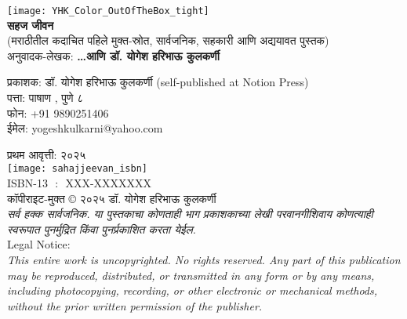 \thispagestyle{empty}

\begin{center}
\texttt{[image: YHK\_Color\_OutOfTheBox\_tight]} \\[1.5em]

\textbf{\Huge सहज जीवन}\\ [0.5em]
{\small(मराठीतील कदाचित पहिले मुक्त-स्रोत, सार्वजनिक, सहकारी आणि अद्ययावत  पुस्तक)}\\[0.5em]

अनुवादक-लेखक: \textbf{{\large \ldots आणि  डॉ. योगेश हरिभाऊ कुलकर्णी}}\\[1.5em]
\end{center}

\vspace{1.5em}

\begin{flushleft}

प्रकाशक: डॉ. योगेश हरिभाऊ कुलकर्णी (self-published at Notion Press)\\
पत्ता:  पाषाण ,  पुणे ८ \\
फोन:  +91 9890251406\\
ईमेल: yogeshkulkarni@yahoo.com\\[1.5em]

\vspace{0.5em}

प्रथम आवृत्ती: २०२५\\[0.5em]

\texttt{[image: sahajjeevan\_isbn]} \\ [0.5em]
ISBN-13 ‏ : ‎ XXX-XXXXXXX\\[1.5em]

कॉपीराइट-मुक्त © २०२५ डॉ. योगेश हरिभाऊ कुलकर्णी\\[0.5em]

{\textit{सर्व हक्क सार्वजनिक. या पुस्तकाचा कोणताही भाग प्रकाशकाच्या लेखी परवानगीशिवाय कोणत्याही स्वरूपात पुनर्मुद्रित किंवा पुनर्प्रकाशित करता येईल.}}\\[1.5em]

{\large Legal Notice:}\\
{\textit{This entire work is uncopyrighted. No rights reserved. Any part of this publication may be reproduced, distributed, or transmitted in any form or by any means, including photocopying, recording, or other electronic or mechanical methods, without the prior written permission of the publisher.}}
\end{flushleft}
\vfill\null
\clearpage

